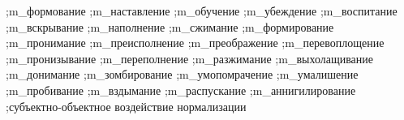 {{		;m\_формование
		;m\_наставление
		;m\_обучение
		;m\_убеждение
		;m\_воспитание
		;m\_вскрывание
		;m\_наполнение
		;m\_сжимание
		;m\_формирование
		;m\_пронимание
		;m\_преисполнение
		;m\_преображение
		;m\_перевоплощение
		;m\_пронизывание
		;m\_переполнение
		;m\_разжимание
		;m\_выхолащивание
		;m\_донимание
		;m\_зомбирование
		;m\_умопомрачение
		;m\_умалишение
		;m\_пробивание
		;m\_вздымание
		;m\_распускание
		;m\_аннигилирование
	}
	;субъектно-объектное воздействие нормализации\\
}
